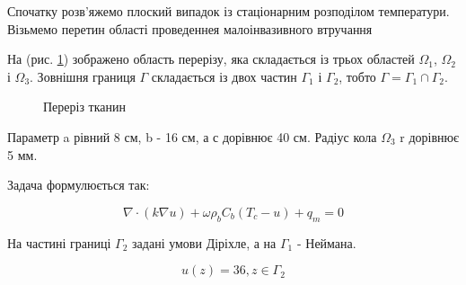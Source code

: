 Спочатку розв'яжемо плоский випадок із стаціонарним розподілом температури.
Візьмемо перетин області проведеннея малоінвазивного втручання

На (рис. \ref{fig:thermo_2d_domain}) зображено область перерізу, яка складається із трьох областей $\Omega_1$, 
$\Omega_2$ і $\Omega_3$. Зовнішня границя $\Gamma$ складається із двох частин $\Gamma_1$ і $\Gamma_2$, тобто 
$\Gamma=\Gamma_1\cap\Gamma_2$. 

\begin{figure}[ht!]
    \centering
    
    \caption{Переріз тканин}
    \label{fig:thermo_2d_domain}
\end{figure}

\noindent Параметр a рівний 8 см, b - 16 см, а с дорівнює 40 см. Радіус кола $\Omega_3$ r дорівнює 5 мм.

\noindent Задача формулюється так:

\begin{equation}
    \label{eqn:thermo_2d_eqn}
    \nabla \cdot (k \nabla u) + \omega \rho_b C_b (T_c - u) + q_m  = 0
\end{equation}

\noindent На частині границі $\Gamma_2$ задані умови Діріхле, а на $\Gamma_1$ - Неймана.

\begin{equation}
    \label{eqn:thermo_2d_cond_1}
    u(z) = 36, z \in \Gamma_2
\end{equation}

